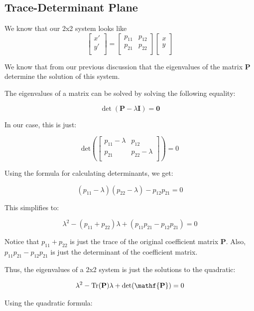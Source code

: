 \documentclass{report}
\begin{document}
\subsection{Trace-Determinant Plane}
We know that our 2x2 system looks like
$$
\begin{bmatrix}
    x' \\
    y' \\
\end{bmatrix}
=
\begin{bmatrix}
    p_{11} & p_{12} \\
    p_{21} & p_{22} \\
\end{bmatrix}
\begin{bmatrix}
    x \\
    y \\
\end{bmatrix}
$$

We know that from our previous discussion that the eigenvalues of the matrix $\mathbf{P}$ determine the solution of this system.

The eigenvalues of a matrix can be solved by solving the following equality:

$$\det(\mathbf{P}-\lambda \mathbf{I}) = \mathbf{0}$$

In our case, this is just:

$$
\text{det}\left(
\begin{bmatrix}
    p_{11} - \lambda & p_{12} \\
    p_{21} & p_{22} - \lambda \\
\end{bmatrix}\right) = 0
$$

Using the formula for calculating determinants, we get:

$$( p_{11} - \lambda)(p_{22} - \lambda)- p_{12}p_{21} = 0$$

This simplifies to:

$$\lambda^2 - (p_{11} + p_{22})\lambda + (p_{11}p_{21}- p_{12}p_{21}) = 0$$

Notice that $p_{11} + p_{22}$ is just the trace of the original coefficient matrix $\mathbf{P}$. Also, $p_{11}p_{21}- p_{12}p_{21}$ is just the determinant of the coefficient matrix.

Thus, the eigenvalues of a 2x2 system is just the solutions to the quadratic:

$$\lambda^2-\Tr(\mathbf{P})\lambda + \det(\mathf{\mathbf{P}}) = 0$$

Using the quadratic formula:
\end{document}
